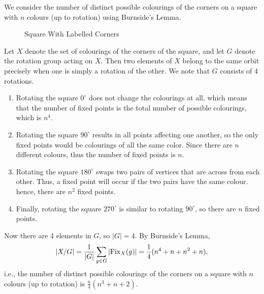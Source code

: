 \begin{example}
    We consider the number of distinct possible colourings of the corners on a square with $n$ colours (up to rotation) using Burnside's Lemma.

    \begin{figure}[h]
	    \centering
	    \caption{Square With Labelled Corners}
	\end{figure}

    Let $X$ denote the set of colourings of the corners of the square, and let $G$ denote the rotation group acting on $X$. Then two elements of $X$ belong to the same orbit precisely when one is simply a rotation of the other. We note that $G$ consists of 4 rotations.
    \begin{enumerate}
        \item Rotating the square $0^\circ$ does not change the colourings at all, which means that the number of fixed points is the total number of possible colourings, which is $n^4$.
        \item Rotating the square $90^\circ$ results in all points affecting one another, so the only fixed points would be colourings of all the same color. Since there are $n$ different colours, thus the number of fixed points is $n$.
        \item Rotating the square $180^\circ$ swaps two pairs of vertices that are across from each other. Thus, a fixed point will occur if the two pairs have the same colour. hence, there are $n^2$ fixed points.
        \item Finally, rotating the square $270^\circ$ is similar to rotating $90^\circ$, so there are $n$ fixed points.
    \end{enumerate}
    Now there are 4 elements in $G$, so $|G| = 4$. By Burnside's Lemma,
    \[
        |X/G| = \frac{1}{|G|}\sum_{g\in G} |\mathrm{Fix}_{X}(g)| = \frac14 (n^4 + n + n^2 + n),
    \]
    i.e., the number of distinct possible colourings of the corners on a square with $n$ colours (up to rotation) is $\frac n4 (n^3 + n + 2)$.
\end{example}

